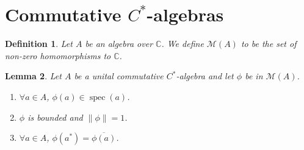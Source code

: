 \documentclass{book}
\newtheorem{definition}{Definition}[section]
\newtheorem{lemma}[definition]{Lemma}
\begin{document}
\section{Commutative \texorpdfstring{\(C^*\)}{C*}-algebras}
\begin{definition}
  Let \(A\) be an algebra over \(\mathbb{C}\). We define \(\mathcal{M}(A)\) to be the set of non-zero homomorphisms to \(\mathbb{C}\).
\end{definition}
\begin{lemma}\label{lemma:142}
  Let \(A\) be a unital commutative \(C^*\)-algebra and let \(\phi \) be in \(\mathcal{M} (A)\).
\begin{enumerate}
  \item \(\forall a\in A\), \(\phi(a)\in \operatorname{spec}(a)\).
  \item \(\phi\) is bounded and \(\|\phi\|=1\).
  \item \(\forall a\in A\), \(\phi(a^*)=\overline{\phi(a)}\).
\end{enumerate}
\end{lemma}
\end{document}
